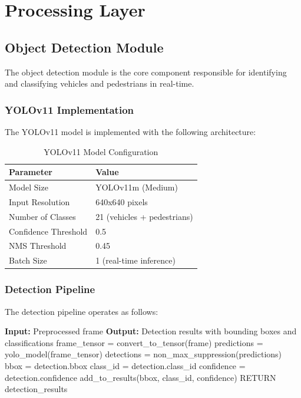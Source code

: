 \section{Processing Layer}

\subsection{Object Detection Module}

The object detection module is the core component responsible for identifying and classifying vehicles and pedestrians in real-time.

\subsubsection{YOLOv11 Implementation}

The YOLOv11 model is implemented with the following architecture:

\begin{table}[h]
\centering
\caption{YOLOv11 Model Configuration}
\begin{tabular}{|l|l|}
\hline
\textbf{Parameter} & \textbf{Value} \\
\hline
Model Size & YOLOv11m (Medium) \\
Input Resolution & 640x640 pixels \\
Number of Classes & 21 (vehicles + pedestrians) \\
Confidence Threshold & 0.5 \\
NMS Threshold & 0.45 \\
Batch Size & 1 (real-time inference) \\
\hline
\end{tabular}
\end{table}

\subsubsection{Detection Pipeline}

The detection pipeline operates as follows:

\begin{algorithmic}[1]
\STATE \textbf{Input:} Preprocessed frame
\STATE \textbf{Output:} Detection results with bounding boxes and classifications
\STATE 
\STATE frame\_tensor = convert\_to\_tensor(frame)
\STATE predictions = yolo\_model(frame\_tensor)
\STATE detections = non\_max\_suppression(predictions)
\STATE 
{}
    \STATE bbox = detection.bbox
    \STATE class\_id = detection.class\_id
    \STATE confidence = detection.confidence
    \STATE 
        \STATE add\_to\_results(bbox, class\_id, confidence)
    \ENDIF
\ENDFOR
\STATE 
\STATE RETURN detection\_results
\end{algorithmic}

